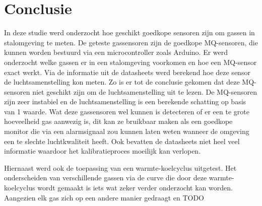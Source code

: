 
\chapter{Conclusie}%
\label{ch:conclusie}





In deze studie werd onderzocht hoe geschikt goedkope sensoren zijn om gassen in stalomgeving te meten. De geteste gassensoren zijn de goedkope MQ-sensoren, die kunnen worden bestuurd via een microcontroller zoals Arduino. Er werd onderzocht welke gassen er in een stalomgeving voorkomen en hoe een MQ-sensor exact werkt. Via de informatie uit de datasheets werd berekend hoe deze sensor de luchtsamenstelling kon meten. 
Zo is er tot de conclusie gekomen dat deze MQ-sensoren niet geschikt zijn om de luchtsamenstelling uit te lezen. De MQ-sensoren zijn zeer instabiel en de luchtsamenstelling is een berekende schatting op basis van 1 waarde. 
Wat deze gassensoren wel kunnen is detecteren of er een te grote hoeveelheid gas aanwezig is, dit kan ze bruikbaar maken als een goedkope monitor die via een alarmsignaal zou kunnen laten weten wanneer de omgeving een te slechte luchtkwaliteit heeft.
Ook bevatten de datasheets niet heel veel informatie waardoor het kalibratieproces moeilijk kan verlopen. 

Hiernaast werd ook de toepassing van een warmte-koelcyclus uitgetest.
Het onderscheiden van verschillende gassen via de curve die door deze warmte-koelcyclus wordt gemaakt is iets wat zeker verder onderzocht kan worden. Aangezien elk gas zich op een andere manier gedraagt en TODO






